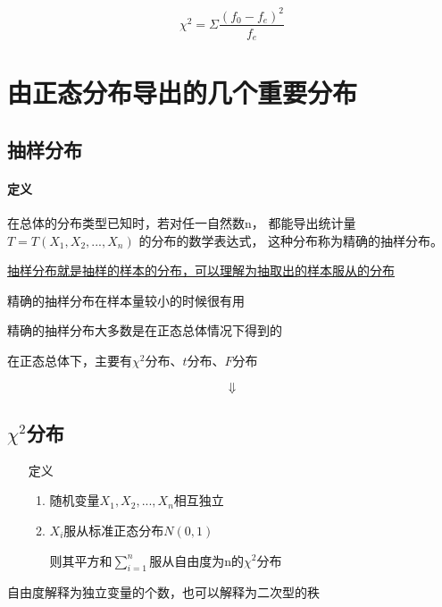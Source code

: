 \documentclass[UTF8,10pt]{book}
\begin{document}
                $$\chi^2=\Sigma \frac{(f_0-f_e)^2}{f_e}$$





    \section{由正态分布导出的几个重要分布}
        \subsection{抽样分布}
            \paragraph{定义} 在总体的分布类型已知时，若对任一自然数n，
            都能导出统计量$T = T(X_1,X_2,...,X_n)$
            的分布的数学表达式，
            这种分布称为精确的抽样分布。
            
            \underline{抽样分布就是抽样的样本的分布，可以理解为抽取出的样本服从的分布}

            {\kaishu 精确的抽样分布在样本量较小的时候很有用}

            {\kaishu 精确的抽样分布大多数是在正态总体情况下得到的}

            {\kaishu 在正态总体下，主要有$\chi^2$分布、$t$分布、$F$分布}

            $$  \Downarrow $$

        \subsection{$\chi^2$分布}
           
            \begin{itemize}
                \item [定义] {
                    \begin{enumerate}
                        \item 随机变量$X_1,X_2,...,X_n$相互独立
                        \item $X_i$服从标准正态分布$N(0,1)$
                        
                        则其平方和$\sum_{i=1}^n$服从自由度为n的$\chi^2$分布
                    \end{enumerate}
                }
            \end{itemize}
            

            {\kaishu 自由度解释为独立变量的个数，也可以解释为二次型的秩}
\end{document}
